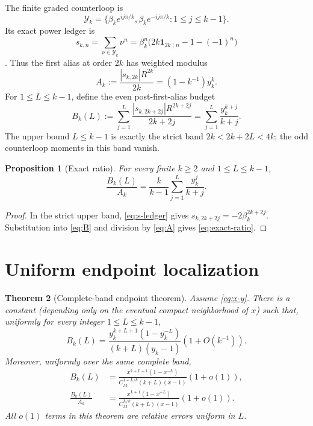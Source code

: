 \documentclass[11pt]{article}
\newtheorem{theorem}{Theorem}[section]
\newtheorem{proposition}[theorem]{Proposition}
\theoremstyle{remark}
\newcommand{\cY}{\mathcal Y}
\newcommand{\one}{\mathbf 1}
\begin{document}
The finite graded counterloop is
\begin{equation}\label{eq:Y}
 \cY_k=\{\beta_ke^{ij\pi/k},\beta_ke^{-ij\pi/k}:1\le j\le k-1\}.
\end{equation}
Its exact power ledger is
\begin{equation}\label{eq:s-ledger}
 s_{k,n}=\sum_{\nu\in\cY_k}\nu^n
 =\beta_k^n\bigl(2k\one_{2k\mid n}-1-(-1)^n\bigr)
\end{equation}
\citep{WangAliasLedger2026,WangHeadCounterloop2026}.  Thus the first alias
at order $2k$ has weighted modulus
\begin{equation}\label{eq:A}
 A_k:=\frac{|s_{k,2k}|R^{2k}}{2k}=(1-k^{-1})y_k^k.
\end{equation}
For $1\le L\le k-1$, define the even post-first-alias budget
\begin{equation}\label{eq:B}
 B_k(L):=\sum_{j=1}^{L}
 \frac{|s_{k,2k+2j}|R^{2k+2j}}{2k+2j}
 =\sum_{j=1}^{L}\frac{y_k^{k+j}}{k+j}.
\end{equation}
The upper bound $L\le k-1$ is exactly the strict band $2k<2k+2L<4k$;
the odd counterloop moments in this band vanish.

\begin{proposition}[Exact ratio]\label{prop:exact}
For every finite $k\ge2$ and $1\le L\le k-1$,
\begin{equation}\label{eq:exact-ratio}
 \frac{B_k(L)}{A_k}=\frac{k}{k-1}\sum_{j=1}^{L}\frac{y_k^j}{k+j}.
\end{equation}
\end{proposition}

\begin{proof}
In the strict upper band, \eqref{eq:s-ledger} gives
$s_{k,2k+2j}=-2\beta_k^{2k+2j}$.  Substitution into \eqref{eq:B} and
division by \eqref{eq:A} gives \eqref{eq:exact-ratio}.
\end{proof}

\section{Uniform endpoint localization}

\begin{theorem}[Complete-band endpoint theorem]\label{thm:uniform}
Assume \eqref{eq:x-y}.  There is a constant (depending only on the eventual
compact neighborhood of $x$) such that, uniformly for every integer
$1\le L\le k-1$,
\begin{equation}\label{eq:y-endpoint}
 \boxed{
 B_k(L)=\frac{y_k^{k+L+1}(1-y_k^{-L})}{(k+L)(y_k-1)}
 \left(1+O(k^{-1})\right).}
\end{equation}
Moreover, uniformly over the same complete band,
\begin{align}
 B_k(L)&=\frac{x^{k+L+1}(1-x^{-L})}
 {C_M^{1+L/k}(k+L)(x-1)}(1+o(1)),\label{eq:x-endpoint}\\
 \frac{B_k(L)}{A_k}&=\frac{x^{L+1}(1-x^{-L})}
 {C_M^{L/k}(k+L)(x-1)}(1+o(1)).\label{eq:ratio-endpoint}
\end{align}
All $o(1)$ terms in this theorem are relative errors uniform in $L$.
\end{theorem}
\end{document}
